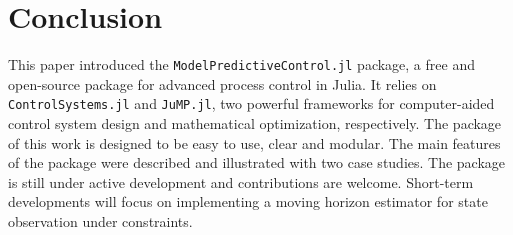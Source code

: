 \section{Conclusion}

This paper introduced the \texttt{ModelPredictiveControl.jl} package, a free and open-source package for advanced process control in Julia. It relies on \texttt{ControlSystems.jl} and \texttt{JuMP.jl}, two powerful frameworks for computer-aided control system design and mathematical optimization, respectively. The package of this work is designed to be easy to use, clear and modular. The main features of the package were described and illustrated with two case studies. The package is still under active development and contributions are welcome. Short-term developments will focus on implementing a moving horizon estimator for state observation under constraints. 